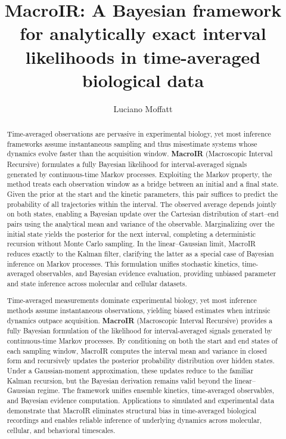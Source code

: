 \documentclass[9pt]{elife}
\title{MacroIR: A Bayesian framework for analytically exact interval likelihoods in time-averaged biological data}
\author[1*]{Luciano Moffatt}
\affil[1]{Instituto de Qu\'imica F\'isica de los Materiales, Medio Ambiente y Energ\'ia (INQUIMAE), CONICET; Facultad de Ciencias Exactas y Naturales, Universidad de Buenos Aires, Ciudad de Buenos Aires, C1428EHA, Argentina}
\begin{document}
	\maketitle
	\begin{abstract}
		Time-averaged observations are pervasive in experimental biology, yet most inference frameworks assume instantaneous sampling and thus misestimate systems whose dynamics evolve faster than the acquisition window. 
		\textbf{MacroIR} (Macroscopic Interval Recursive) formulates a fully Bayesian likelihood for interval-averaged signals generated by continuous-time Markov processes. 
		Exploiting the Markov property, the method treats each observation window as a bridge between an initial and a final state. 
		Given the prior at the start and the kinetic parameters, this pair suffices to predict the probability of all trajectories within the interval. 
		The observed average depends jointly on both states, enabling a Bayesian update over the Cartesian distribution of start–end pairs using the analytical mean and variance of the observable. 
		Marginalizing over the initial state yields the posterior for the next interval, completing a deterministic recursion without Monte Carlo sampling. 
		In the linear–Gaussian limit, MacroIR reduces exactly to the Kalman filter, clarifying the latter as a special case of Bayesian inference on Markov processes. 
		This formulation unifies stochastic kinetics, time-averaged observables, and Bayesian evidence evaluation, providing unbiased parameter and state inference across molecular and cellular datasets.
	\end{abstract}
	\begin{abstract}
		Time-averaged measurements dominate experimental biology, yet most inference methods assume instantaneous observations, yielding biased estimates when intrinsic dynamics outpace acquisition. 
		\textbf{MacroIR} (Macroscopic Interval Recursive) provides a fully Bayesian formulation of the likelihood for interval-averaged signals generated by continuous-time Markov processes. 
		By conditioning on both the start and end states of each sampling window, MacroIR computes the interval mean and variance in closed form and recursively updates the posterior probability distribution over hidden states. 
		Under a Gaussian-moment approximation, these updates reduce to the familiar Kalman recursion, but the Bayesian derivation remains valid beyond the linear–Gaussian regime. 
		The framework unifies ensemble kinetics, time-averaged observables, and Bayesian evidence computation. 
		Applications to simulated and experimental data demonstrate that MacroIR eliminates structural bias in time-averaged biological recordings and enables reliable inference of underlying dynamics across molecular, cellular, and behavioral timescales.
	\end{abstract}
	
\end{document}
